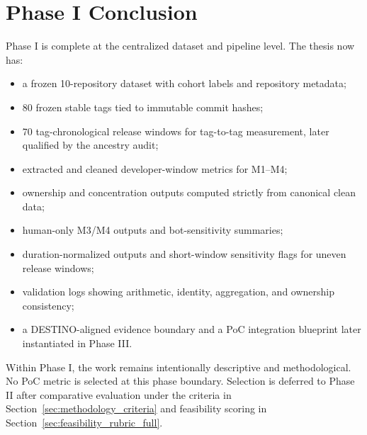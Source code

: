 \section{Phase I Conclusion}
\label{sec:phase1_conclusion}

Phase I is complete at the centralized dataset and pipeline level. The thesis now has:
\begin{itemize}[leftmargin=*]
  \item a frozen 10-repository dataset with cohort labels and repository metadata;
  \item 80 frozen stable tags tied to immutable commit hashes;
  \item 70 tag-chronological release windows for tag-to-tag measurement, later qualified by the ancestry audit;
  \item extracted and cleaned developer-window metrics for M1--M4;
  \item ownership and concentration outputs computed strictly from canonical clean data;
  \item human-only M3/M4 outputs and bot-sensitivity summaries;
  \item duration-normalized outputs and short-window sensitivity flags for uneven release windows;
  \item validation logs showing arithmetic, identity, aggregation, and ownership consistency;
  \item a DESTINO-aligned evidence boundary and a PoC integration blueprint later instantiated in Phase III.
\end{itemize}

Within Phase I, the work remains intentionally descriptive and methodological. No PoC metric is selected at this phase boundary.
Selection is deferred to Phase II after comparative evaluation under the criteria in
Section~\ref{sec:methodology_criteria} and feasibility scoring in Section~\ref{sec:feasibility_rubric_full}.
